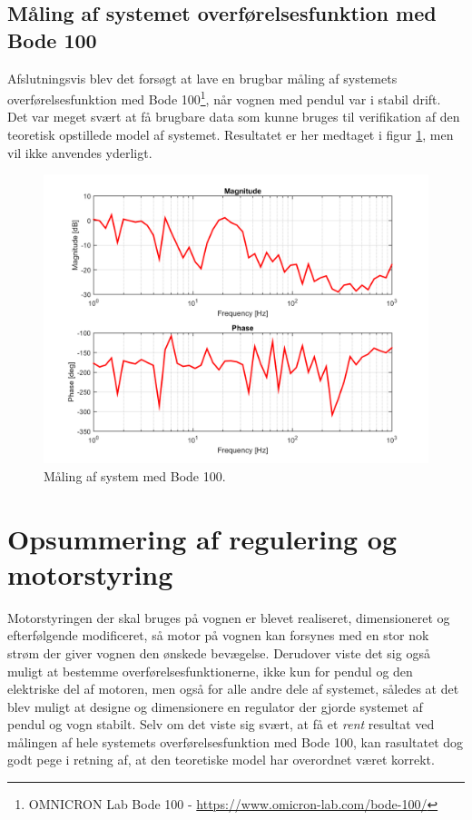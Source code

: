 \subsection{Måling af systemet overførelsesfunktion med Bode 100}
Afslutningsvis blev det forsøgt at lave en brugbar måling af systemets overførelsesfunktion med Bode 100\footnote{OMNICRON Lab Bode 100 - \url{https://www.omicron-lab.com/bode-100/}}, når vognen med pendul var i stabil drift.
Det var meget svært at få brugbare data som kunne bruges til verifikation af den teoretisk opstillede model af systemet.
Resultatet er her medtaget i figur \ref{fig:bode100}, men vil ikke anvendes yderligt.
\begin{figure}[h!]
	\centering
	\includegraphics[width=.8\textwidth]{billeder/bode100.png}
	\caption{Måling af system med Bode 100.}
	\label{fig:bode100}
\end{figure}

\section{Opsummering af regulering og motorstyring}
Motorstyringen der skal bruges på vognen er blevet realiseret, dimensioneret og efterfølgende modificeret, så motor på vognen kan forsynes med en stor nok strøm der giver vognen den ønskede bevægelse.
Derudover viste det sig også muligt at bestemme overførelsesfunktionerne, ikke kun for pendul og den elektriske del af motoren, men også for alle andre dele af systemet, således at det blev muligt at designe og dimensionere en regulator der gjorde systemet af pendul og vogn stabilt.
Selv om det viste sig svært, at få et \textit{rent} resultat ved målingen af hele systemets overførelsesfunktion med Bode 100, kan rasultatet dog godt pege i retning af, at den teoretiske model har overordnet været korrekt.  




